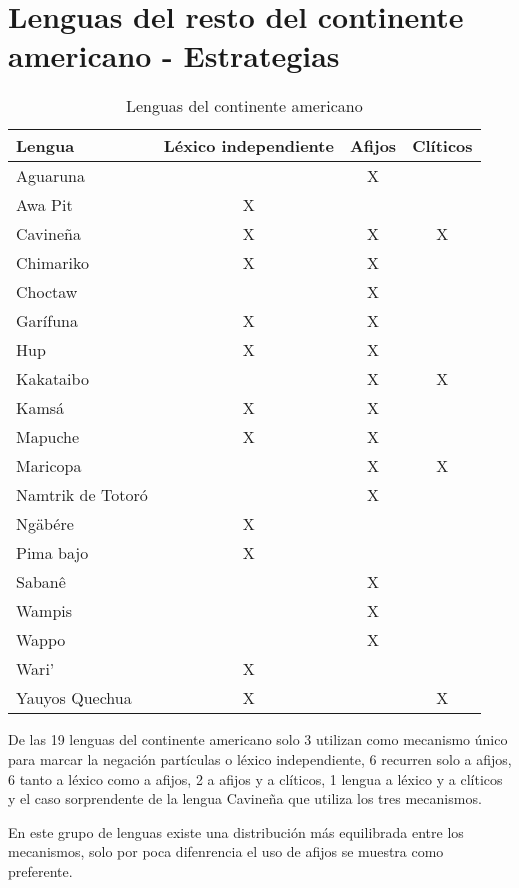 \section*{Lenguas del resto del continente americano - Estrategias}

\begin{table}[htbp]
\centering
\begin{tabular}{lccc}
\textbf{Lengua} & \textbf{Léxico independiente} & \textbf{Afijos} & \textbf{Clíticos} \\
\hline
Aguaruna &       & X     &  \\
Awa Pit & X     &       &  \\
Cavineña & X     & X     & X \\
Chimariko & X     & X     &  \\
Choctaw &       & X     &  \\
Garífuna & X     & X     &  \\
Hup   & X     & X     &  \\
Kakataibo &       & X     & X \\
Kamsá & X     & X     &  \\
Mapuche & X     & X     &  \\
Maricopa &       & X     & X \\
Namtrik de Totoró &  & X &  \\
Ngäbére & X     &       &  \\
Pima bajo & X     &       &  \\
Sabanê &       & X     &  \\
Wampis &       & X     &  \\
Wappo &       & X     &  \\
Wari' & X     &       &  \\
Yauyos Quechua & X     &       & X \\
\hline
\end{tabular}
\caption{Lenguas del continente americano}
\label{cuadro6}
\end{table}

\noindent De las 19 lenguas del continente americano solo 3 utilizan como mecanismo único para marcar la negación partículas o léxico independiente, 6 recurren solo a afijos, 6 tanto a léxico como a afijos, 2 a afijos y a clíticos, 1 lengua a léxico y a clíticos y el caso sorprendente de la lengua Cavineña que utiliza los tres mecanismos.

En este grupo de lenguas existe una distribución más equilibrada entre los mecanismos, solo por poca difenrencia el uso de afijos se muestra como preferente.

